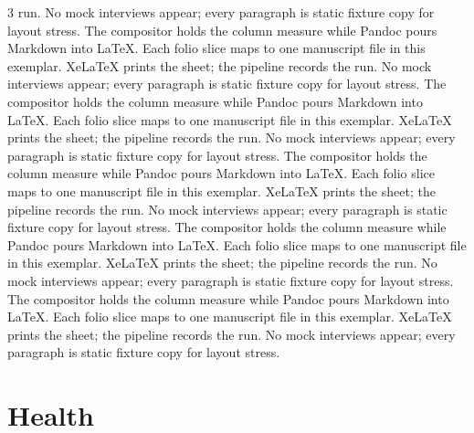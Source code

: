 \documentclass[
]{article}
\begin{document}
\begin{multicols}{3}
run. No mock interviews appear; every paragraph is static fixture copy
for layout stress. The compositor holds the column measure while Pandoc
pours Markdown into LaTeX. Each folio slice maps to one manuscript file
in this exemplar. XeLaTeX prints the sheet; the pipeline records the
run. No mock interviews appear; every paragraph is static fixture copy
for layout stress. The compositor holds the column measure while Pandoc
pours Markdown into LaTeX. Each folio slice maps to one manuscript file
in this exemplar. XeLaTeX prints the sheet; the pipeline records the
run. No mock interviews appear; every paragraph is static fixture copy
for layout stress. The compositor holds the column measure while Pandoc
pours Markdown into LaTeX. Each folio slice maps to one manuscript file
in this exemplar. XeLaTeX prints the sheet; the pipeline records the
run. No mock interviews appear; every paragraph is static fixture copy
for layout stress. The compositor holds the column measure while Pandoc
pours Markdown into LaTeX. Each folio slice maps to one manuscript file
in this exemplar. XeLaTeX prints the sheet; the pipeline records the
run. No mock interviews appear; every paragraph is static fixture copy
for layout stress. The compositor holds the column measure while Pandoc
pours Markdown into LaTeX. Each folio slice maps to one manuscript file
in this exemplar. XeLaTeX prints the sheet; the pipeline records the
run. No mock interviews appear; every paragraph is static fixture copy
for layout stress.

\end{multicols}

\newpage

\section{Health}\label{health}
\end{document}
